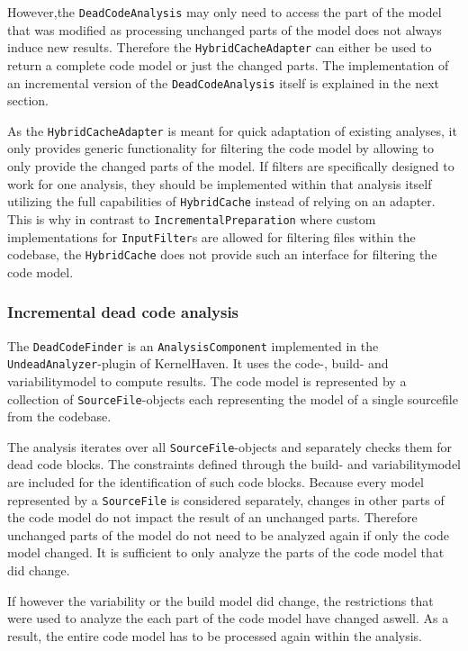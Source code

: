 \documentclass[a4paper]{article}
\begin{document}
However,the \texttt{Dead\-Code\-Analysis} may only need to access the part of the model that was modified as processing unchanged parts of the model does not always induce new results. Therefore the \texttt{Hybrid\-Cache\-Adapter} can either be used to return a complete code model or just the changed parts. The implementation of an incremental version of the \texttt{Dead\-Code\-Analysis} itself is explained in the next section.

As the \texttt{Hybrid\-Cache\-Adapter} is meant for quick adaptation of existing analyses, it only provides generic functionality for filtering the code model by allowing to only provide the changed parts of the model. If filters are specifically designed to work for one analysis, they should be implemented within that analysis itself utilizing the full capabilities of \texttt{Hybrid\-Cache} instead of relying on an adapter. This is why in contrast to \texttt{Incremental\-Preparation} where custom implementations for \texttt{InputFilter}s are allowed for filtering files within the codebase, the \texttt{Hybrid\-Cache} does not provide such an interface for filtering the code model.

\subsubsection{Incremental dead code analysis} \label{incremental-dead-code-analysis}

The \texttt{Dead\-Code\-Finder} is an \texttt{Analysis\-Component} implemented in the \texttt{UndeadAnalyzer}-plugin of KernelHaven. It uses the code-, build- and variabilitymodel to compute results. The code model is represented by a collection of \texttt{Source\-File}-objects each representing the model of a single sourcefile from the codebase.

The analysis iterates over all \texttt{Source\-File}-objects and separately checks them for dead code blocks. The constraints defined through the build- and variabilitymodel are included for the identification of such code blocks. Because every model represented by a \texttt{Source\-File} is considered separately, changes in other parts of the code model do not impact the result of an unchanged parts. Therefore unchanged parts of the model do not need to be analyzed again if only the code model changed. It is sufficient to only analyze the parts of the code model that did change.

If however the variability or the build model did change, the restrictions that were used to analyze the each part of the code model have changed aswell. As a result, the entire code model has to be processed again within the analysis.
\end{document}
